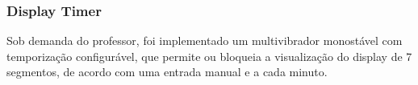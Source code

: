 \subsubsection{Display Timer}

Sob demanda do professor, foi implementado um multivibrador monostável com temporização configurável, que permite ou bloqueia a visualização do display de 7 segmentos, de acordo com uma entrada manual e a cada minuto.

